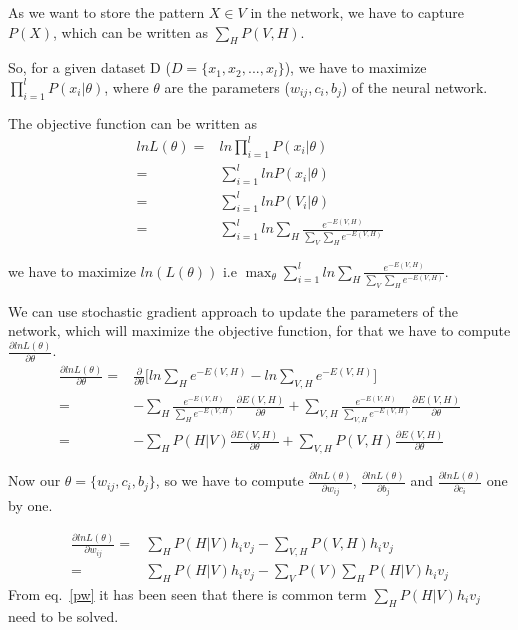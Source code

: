 \begin{spacing}{1.5}
As we want to store the pattern $X \in V$ in the network, we have to capture $P(X)$, which can be written as $\sum_{H}P(V,H)$.

So, for a given dataset D ($D=\{x_{1}, x_{2}, ..., x_{l}\}$), we have to maximize $\prod_{i=1}^{l}P(x_{i}|\theta)$, where $\theta$ are the parameters ($w_{ij},c_{i},b_{j}$) of the neural network. 

The objective function can be written as
\begin{equation}
 \begin{aligned}
 ln L(\theta)=&ln \prod_{i=1}^{l}P(x_{i}|\theta)\\
            =&\sum_{i=1}^{l}ln P(x_{i}|\theta)\\
            =&\sum_{i=1}^{l} ln P(V_{i}|\theta)\\
            =&\sum_{i=1}^{l} ln \sum_{H}\frac{e^{-E(V,H)}}{\sum_{V}\sum_{H}e^{-E(V,H)}}
 \end{aligned}
\end{equation}

we have to maximize $ln (L(\theta))$ i.e
$\max_{\theta}\sum_{i=1}^{l} ln \sum_{H}\frac{e^{-E(V,H)}}{\sum_{V}\sum_{H}e^{-E(V,H)}} $. 

We can use stochastic gradient approach to update the parameters of the network, which will maximize the objective function, for that we have to compute $\frac{\partial ln L(\theta)}{\partial \theta}$.
\begin{equation}
    \begin{aligned}
    \frac{\partial ln L(\theta)}{\partial \theta}=&\frac{\partial }{\partial \theta}
    \big[ln \sum_{H}e^{-E(V,H)}-ln \sum_{V,H}e^{-E(V,H)}\big]\\
    =&-\sum_{H}\frac{e^{-E(V,H)}}{\sum_{H}e^{-E(V,H)}}\frac{\partial E(V,H)}{\partial \theta}+\sum_{V,H}\frac{e^{-E(V,H)}}{\sum_{V,H}e^{-E(V,H)}}\frac{\partial E(V,H)}{\partial \theta}\\
    =&-\sum_{H}P(H|V)\frac{\partial E(V,H)}{\partial \theta}+\sum_{V,H}P(V,H)\frac{\partial E(V,H)}{\partial \theta}
    \end{aligned}
\end{equation}

Now our $\theta =\{w_{ij},c_{i},b_{j}\}$, so we have to compute $\frac{\partial ln L(\theta)}{\partial w_{ij}}$, $\frac{\partial ln L(\theta)}{\partial b_{j}}$ and $\frac{\partial ln L(\theta)}{\partial c_{i}}$ one by one.

\begin{equation}
\label{pw}
    \begin{aligned}
    \frac{\partial ln L(\theta)}{\partial w_{ij}}=&\sum_{H}P(H|V)h_{i}v_{j}-\sum_{V,H}P(V,H)h_{i}v_{j}\\
        =&\sum_{H}P(H|V)h_{i}v_{j}-\sum_{V}P(V)\sum_{H}P(H|V)h_{i}v_{j}
    \end{aligned}
\end{equation}
From eq.~\ref{pw} it has been seen that there is common term $\sum_{H}P(H|V)h_{i}v_{j}$ need to be solved.


\end{spacing}
